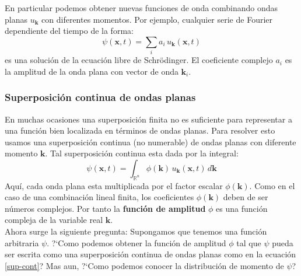 \documentclass[12pt]{book}
\numberwithin{equation}{chapter}
\def\R{\mathbb{R}}
\def\x{\mathbf{x}}
\def\k{\mathbf{k}}
\begin{document}
\rightline{$\dag$}
\vspace{5 mm}

En particular podemos obtener nuevas funciones de onda combinando ondas planas $u_{\k}$ con diferentes momentos. Por ejemplo, cualquier serie de Fourier dependiente del tiempo de la forma:
\begin{equation}\label{psi-sf}
\psi (\x,t)= \sum_{i} a_{i}\, u_{\k}(\x, t)
\end{equation}
es una soluci\'on de la ecuaci\'on libre de Schr\"odinger. El coeficiente complejo $a_{i}$ es la amplitud de la onda plana con vector de onda $\k_{i}$.

\subsubsection{Superposici\'on continua de ondas planas}
En muchas ocasiones una superposici\'on finita no es suficiente para representar a una funci\'on bien localizada en t\'erminos de ondas planas. Para resolver esto usamos una superposici\'on continua (no numerable) de ondas planas con diferente momento $\k$. Tal superposici\'on continua esta dada por la integral:
\begin{equation}\label{sup-cont}
\psi(\x , t)= \int_{\R^{n}} \phi(\k)\, u_{\k}(\x,t)\, d\k
\end{equation}
Aqu\'i, cada onda plana esta multiplicada por el factor escalar $\phi(\k)$. Como en el caso de una combinaci\'on lineal finita, los coeficientes $\phi (\k)$ deben de ser n\'umeros complejos. Por tanto la {\bf funci\'on de amplitud} $\phi$ es una funci\'on compleja de la variable real $\k$. \\

Ahora surge la siguiente pregunta: Supongamos que tenemos una funci\'on arbitraria $\psi$. ?`Como podemos obtener la funci\'on de amplitud $\phi$ tal que $\psi$ pueda ser escrita como una superposici\'on continua de ondas planas como en la ecuaci\'on \eqref{sup-cont}? Mas aun, ?`Como podemos conocer la distribuci\'on de momento de $\psi$? \\
\end{document}

